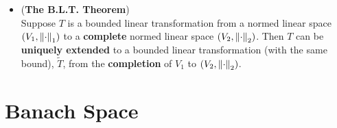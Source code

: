 \documentclass[11pt]{article}
\begin{document}
\begin{itemize}
\item \begin{theorem} (\textbf{The B.L.T. Theorem}) \citep{reed1980methods}\\
Suppose $T$ is a bounded linear transformation from a normed linear space $(V_1, \left\|\cdot\right\|_{1})$ to a \textbf{complete} normed linear space $(V_2, \left\|\cdot\right\|_{2})$. Then $T$ can be \textbf{uniquely extended} to a bounded linear transformation (with the same bound), $\widetilde{T}$, from the \textbf{completion} of $V_1$ to $(V_2, \left\|\cdot\right\|_{2})$.
\end{theorem}
\end{itemize}

\section{Banach Space}
\end{document}
